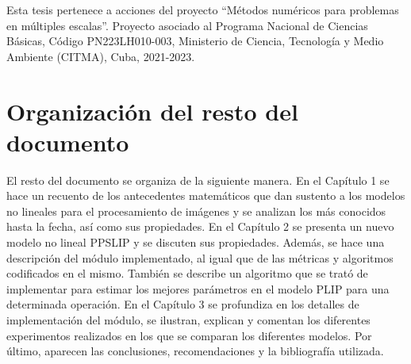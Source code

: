 Esta tesis pertenece a acciones del proyecto ``Métodos numéricos para problemas en múltiples escalas''. Proyecto asociado al Programa Nacional de Ciencias Básicas, Código PN223LH010-003, Ministerio de Ciencia, Tecnología y Medio Ambiente (CITMA), Cuba, 2021-2023.

\section*{Organizaci\'on del resto del documento}

El resto del documento se organiza de la siguiente manera. En el Cap\'itulo 1 se hace un recuento de los antecedentes matem\'aticos que dan sustento a los modelos no lineales para el procesamiento de im\'agenes y se analizan los m\'as conocidos hasta la fecha, as\'i como sus propiedades. En el Cap\'itulo 2 se presenta un nuevo modelo no lineal PPSLIP y se discuten sus propiedades. Adem\'as, se hace una descripci\'on del m\'odulo implementado, al igual que de las m\'etricas y algoritmos codificados en el mismo. Tambi\'en se describe un algoritmo que se trat\'o de implementar para estimar los mejores par\'ametros en el modelo PLIP para una determinada operaci\'on. En el Cap\'itulo 3 se profundiza en los detalles de implementaci\'on del m\'odulo, se ilustran, explican y comentan los diferentes experimentos realizados en los que se comparan los diferentes modelos. Por \'ultimo, aparecen las conclusiones, recomendaciones y la bibliograf\'ia utilizada.
